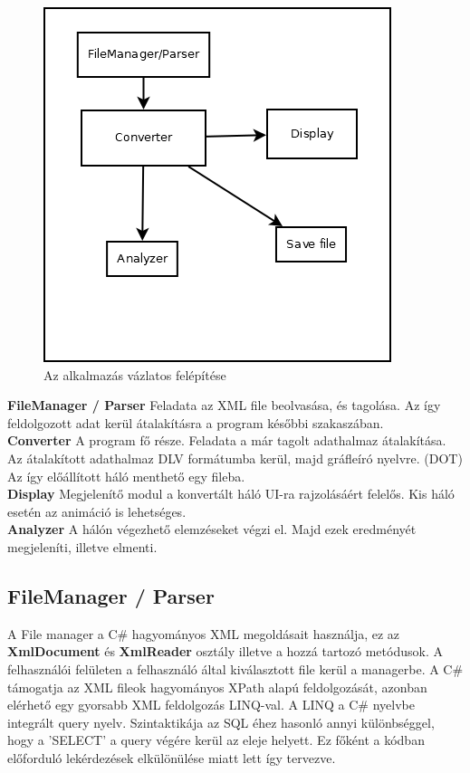 \begin{figure}[h!]
\centering
\includegraphics[scale=0.6]{images/scheme.png}
\caption{Az alkalmazás vázlatos felépítése}
\label{fig:scheme}
\end{figure}

\textbf{FileManager / Parser } Feladata az XML file beolvasása, és tagolása. Az így feldolgozott adat kerül átalakításra a program későbbi szakaszában.\\
\textbf{Converter} A program fő része. Feladata a már tagolt adathalmaz átalakítása. Az átalakított adathalmaz DLV formátumba kerül, majd gráfleíró nyelvre. (DOT) Az így előállított háló menthető egy fileba.\\
\textbf{Display} Megjelenítő modul a konvertált háló UI-ra rajzolásáért felelős. Kis háló esetén az animáció is lehetséges.\\
\textbf{Analyzer} A hálón végezhető elemzéseket végzi el. Majd ezek eredményét megjeleníti, illetve elmenti. 

\subsection{FileManager / Parser }
A File manager a C\# hagyományos XML megoldásait használja, ez az \textbf{XmlDocument} és \textbf{XmlReader} osztály illetve a hozzá tartozó metódusok. A felhasználói felületen a felhasználó által kiválasztott file kerül a managerbe. A C\# támogatja az XML fileok hagyományos XPath alapú feldolgozását, azonban elérhető egy gyorsabb XML feldolgozás LINQ-val. A LINQ a C\# nyelvbe integrált query nyelv. Szintaktikája az SQL éhez hasonló annyi különbséggel, hogy a 'SELECT' a query végére kerül az eleje helyett. Ez főként a kódban előforduló lekérdezések elkülönülése miatt lett így tervezve. 
